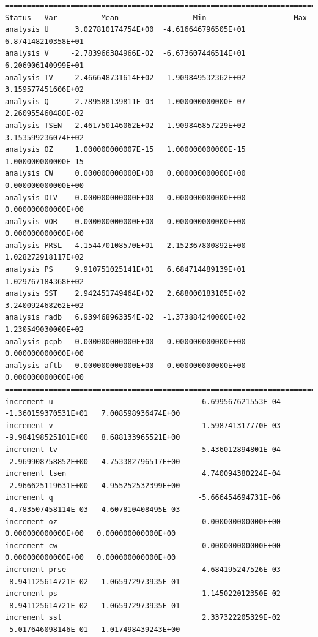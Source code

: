 \begin{scriptsize}
\begin{verbatim}
================================================================================
Status   Var          Mean                 Min                    Max
analysis U      3.027810174754E+00  -4.616646796505E+01   6.874148210358E+01
analysis V     -2.783966384966E-02  -6.673607446514E+01   6.206906140999E+01
analysis TV     2.466648731614E+02   1.909849532362E+02   3.159577451606E+02
analysis Q      2.789588139811E-03   1.000000000000E-07   2.260955460480E-02
analysis TSEN   2.461750146062E+02   1.909846857229E+02   3.153599236074E+02
analysis OZ     1.000000000007E-15   1.000000000000E-15   1.000000000000E-15
analysis CW     0.000000000000E+00   0.000000000000E+00   0.000000000000E+00
analysis DIV    0.000000000000E+00   0.000000000000E+00   0.000000000000E+00
analysis VOR    0.000000000000E+00   0.000000000000E+00   0.000000000000E+00
analysis PRSL   4.154470108570E+01   2.152367800892E+00   1.028272918117E+02
analysis PS     9.910751025141E+01   6.684714489139E+01   1.029767184368E+02
analysis SST    2.942451749464E+02   2.688000183105E+02   3.240092468262E+02
analysis radb   6.939468963354E-02  -1.373884240000E+02   1.230549030000E+02
analysis pcpb   0.000000000000E+00   0.000000000000E+00   0.000000000000E+00
analysis aftb   0.000000000000E+00   0.000000000000E+00   0.000000000000E+00
================================================================================
increment u                                  6.699567621553E-04  -1.360159370531E+01   7.008598936474E+00
increment v                                  1.598741317770E-03  -9.984198525101E+00   8.688133965521E+00
increment tv                                -5.436012894801E-04  -2.969908758852E+00   4.753382796517E+00
increment tsen                               4.740094380224E-04  -2.966625119631E+00   4.955252532399E+00
increment q                                 -5.666454694731E-06  -4.783507458114E-03   4.607810408495E-03
increment oz                                 0.000000000000E+00   0.000000000000E+00   0.000000000000E+00
increment cw                                 0.000000000000E+00   0.000000000000E+00   0.000000000000E+00
increment prse                               4.684195247526E-03  -8.941125614721E-02   1.065972973935E-01
increment ps                                 1.145022012350E-02  -8.941125614721E-02   1.065972973935E-01
increment sst                                2.337322205329E-02  -5.017646098146E-01   1.017498439243E+00
\end{verbatim}
\end{scriptsize}
